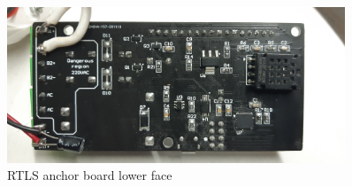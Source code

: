 \documentclass[\main/thesis.tex]{subfiles}
\begin{document}
\begin{figure}[H]
    \begin{center}
        \includegraphics[width=0.9\textwidth]{rtls_anchor_hw_lower.jpg}
    \end{center}
    \caption{RTLS anchor board lower face}
    \label{fig:rtls_anchor_hw_lower}
\end{figure}
\end{document}
